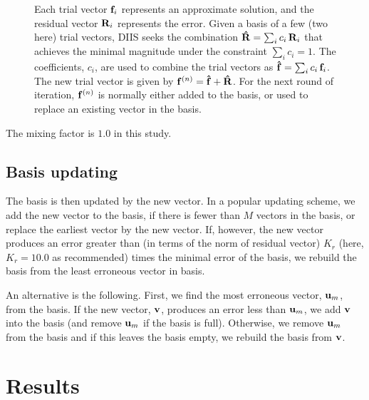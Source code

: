 \documentclass[aip,jcp,preprint,superscriptaddress]{revtex4-1}
\begin{document}
\begin{figure}
{    %
    Each trial vector $\mathbf{f}_i$
    represents an approximate solution,
    and the residual vector $\mathbf{R}_i$
    represents the error.
    Given a basis of a few (two here) trial vectors,
    DIIS seeks the combination
    $\mathbf{\hat R} = \sum_i c_i \, \mathbf{R}_i$
    that achieves the minimal magnitude
    under the constraint
    $\sum_i c_i = 1$.
    The coefficients, $c_i$, are used
    to combine the trial vectors as
    $\mathbf{\hat f} = \sum_i c_i \, \mathbf{f}_i$.
    The new trial vector is given by
    $\mathbf{f}^{(n)} = \mathbf{\hat f} + \mathbf{\hat R}$.
    For the next round of iteration,
    $\mathbf{f}^{(n)}$ is normally either added
    to the basis, or used to replace an existing vector
    in the basis.
  }
\end{figure}




The mixing factor is $1.0$ in this study.



\subsection{Basis updating}



The basis is then updated by the new vector.
%
In a popular updating scheme\cite{kovalenko1999},
we add the new vector to the basis,
if there is fewer than $M$ vectors in the basis,
%
or replace the earliest vector by the new vector.
%
If, however, the new vector
produces an error greater than
(in terms of the norm of residual vector)
$K_r$ (here, $K_r = 10.0$ as recommended)
times the minimal error of the basis,
%
we rebuild the basis
from the least erroneous vector in basis.



An alternative is the following.
%
First, we find the most erroneous vector,
$\mathbf{u}_m$, from the basis.
%
If the new vector, $\mathbf{v}$,
produces an error less than $\mathbf{u}_m$,
we add $\mathbf{v}$ into the basis
(and remove $\mathbf{u}_m$ if the basis is full).
%
Otherwise,
we remove $\mathbf{u}_m$ from the basis
and if this leaves the basis empty,
we rebuild the basis from $\mathbf{v}$.
%



\section{Results}
\end{document}
